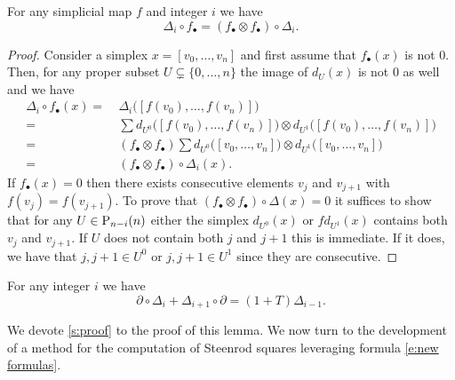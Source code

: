 \begin{lemma} \label{l:naturality}
	For any simplicial map $f$ and integer $i$ we have
	\begin{equation*}
	\Delta_i \circ f_\bullet = (f_\bullet \otimes f_\bullet) \circ \Delta_i.
	\end{equation*}
\end{lemma}

\begin{proof}
	Consider a simplex $x = [v_0, \dots, v_n]$ and first assume that $f_\bullet(x)$ is not $0$.
	Then, for any proper subset $U \subsetneq \{0, \dots, n\}$ the image of $d_U(x)$ is not $0$ as well and we have
	\begin{align*}
	\Delta_i \circ f_\bullet(x) =\ &
	\Delta_i \big([f(v_0), \dots, f(v_n)]\big) \\ =\ &
	\sum d_{U^0} \big([f(v_0), \dots, f(v_n)]\big) \otimes d_{U^1} \big([f(v_0), \dots, f(v_n)]\big) \\ =\ &
	(f_\bullet \otimes f_\bullet) \sum d_{U^0} \big([v_0, \dots, v_n]\big) \otimes d_{U^1} \big([v_0, \dots, v_n]\big) \\ =\ &
	(f_\bullet \otimes f_\bullet) \circ \Delta_i(x).
	\end{align*}
	If $f_\bullet(x) = 0$ then there exists consecutive elements $v_j$ and $v_{j+1}$ with $f(v_j) = f(v_{j+1})$.
	To prove that $(f_\bullet \otimes f_\bullet) \circ \Delta(x) = 0$ it suffices to show that for any $U \in \P_{n-i}(n)$ either the simplex $d_{U^0}(x)$ or $f d_{U^1}(x)$ contains both $v_j$ and $v_{j+1}$.
	If $U$ does not contain both $j$ and $j+1$ this is immediate.
	If it does, we have that $j, j+1 \in U^0$ or $j, j+1 \in U^1$ since they are consecutive.
\end{proof}

\begin{lemma} \label{l:main}
	For any integer $i$ we have
	\begin{equation*}
	\partial \circ \Delta_{i} + \Delta_{i+1} \circ \partial = (1+T) \Delta_{i-1}.
	\end{equation*}
\end{lemma}

We devote \cref{s:proof} to the proof of this lemma.
We now turn to the development of a method for the computation of Steenrod squares leveraging formula \eqref{e:new formulas}.